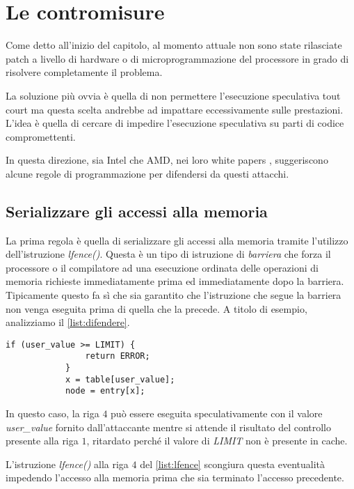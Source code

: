 	\section{Le contromisure}
		Come detto all'inizio del capitolo, al momento attuale non sono state rilasciate patch a livello di hardware o di microprogrammazione del processore in grado di risolvere completamente il problema.
		
		La soluzione più ovvia è quella di non permettere l'esecuzione speculativa tout court ma questa scelta andrebbe ad impattare eccessivamente sulle prestazioni. L'idea è quella di cercare di impedire l'esecuzione speculativa su parti di codice compromettenti.
		
		In questa direzione, sia Intel che AMD, nei loro white papers \cite{AMD2018speculation,intel2018speculative}, suggeriscono alcune regole di programmazione per difendersi da questi attacchi.
		
		\subsection*{Serializzare gli accessi alla memoria}
		
		La prima regola è quella di serializzare gli accessi alla memoria tramite l'utilizzo dell'istruzione \emph{lfence()}. Questa è un tipo di istruzione di \emph{barriera} che forza il processore o il compilatore ad una esecuzione ordinata delle operazioni di memoria richieste immediatamente prima ed immediatamente dopo la barriera. Tipicamente questo fa sì che sia garantito che l'istruzione che segue la barriera non venga eseguita prima di quella che la precede. A titolo di esempio, analizziamo il \cref{list:difendere}.
		
		\begin{lstlisting}[caption={codice da difendere},label={list:difendere}]
			if (user_value >= LIMIT) {
				return ERROR;
			} 
			x = table[user_value]; 
			node = entry[x];
		\end{lstlisting}
		
		In questo caso, la riga $4$ può essere eseguita speculativamente con il valore \emph{user\_value} fornito dall'attaccante mentre si attende il risultato del controllo presente alla riga $1$, ritardato perché il valore di \emph{LIMIT} non è presente in cache. 
		
		L'istruzione \emph{lfence()} alla riga $4$ del \cref{list:lfence} scongiura questa eventualità impedendo l'accesso alla memoria prima che sia terminato l'accesso precedente.
		
